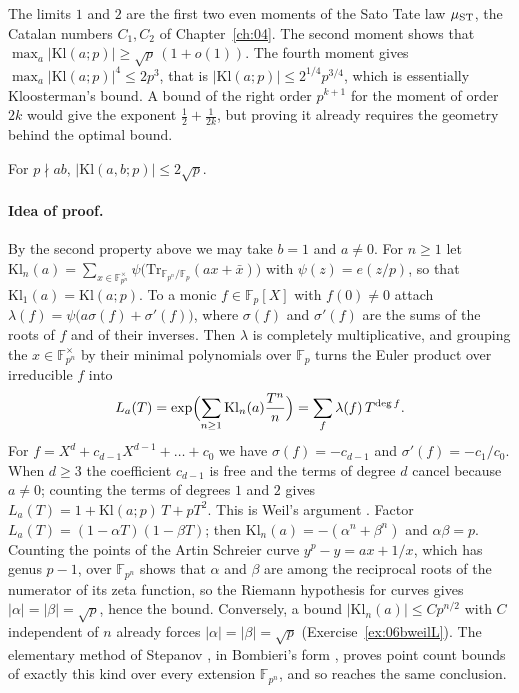 The limits $1$ and $2$ are the first two even moments of the Sato Tate law $\mu_{\mathrm{ST}}$, the Catalan numbers $C_1,C_2$ of Chapter~\ref{ch:04}. The second moment shows that $\max_a|\mathrm{Kl}(a;p)|\ge\sqrt{p}\,(1+o(1))$. The fourth moment gives $\max_a|\mathrm{Kl}(a;p)|^4\le2p^3$, that is $|\mathrm{Kl}(a;p)|\le2^{1/4}p^{3/4}$, which is essentially Kloosterman's bound. A bound of the right order $p^{k+1}$ for the moment of order $2k$ would give the exponent $\frac12+\frac1{2k}$, but proving it already requires the geometry behind the optimal bound.

\begin{theorem}\label{thm:06bweil}
For $p\nmid ab$, $|\mathrm{Kl}(a,b;p)|\le 2\sqrt p$.
\end{theorem}

\paragraph{Idea of proof.} By the second property above we may take $b=1$ and $a\ne0$. For $n\ge1$ let $\mathrm{Kl}_n(a)=\sum_{x\in\mathbb{F}_{p^n}^\times}\psi\bigl(\mathrm{Tr}_{\mathbb{F}_{p^n}/\mathbb{F}_p}(ax+\bar x)\bigr)$ with $\psi(z)=e(z/p)$, so that $\mathrm{Kl}_1(a)=\mathrm{Kl}(a;p)$. To a monic $f\in\mathbb{F}_p[X]$ with $f(0)\ne0$ attach $\lambda(f)=\psi\bigl(a\sigma(f)+\sigma'(f)\bigr)$, where $\sigma(f)$ and $\sigma'(f)$ are the sums of the roots of $f$ and of their inverses. Then $\lambda$ is completely multiplicative, and grouping the $x\in\mathbb{F}_{p^n}^\times$ by their minimal polynomials over $\mathbb{F}_p$ turns the Euler product over irreducible $f$ into
\[
L_a(T)=\exp\Bigl(\sum_{n\ge1}\mathrm{Kl}_n(a)\frac{T^n}{n}\Bigr)=\sum_{f}\lambda(f)\,T^{\deg f}.
\]
For $f=X^d+c_{d-1}X^{d-1}+\dots+c_0$ we have $\sigma(f)=-c_{d-1}$ and $\sigma'(f)=-c_1/c_0$. When $d\ge3$ the coefficient $c_{d-1}$ is free and the terms of degree $d$ cancel because $a\ne0$; counting the terms of degrees $1$ and $2$ gives $L_a(T)=1+\mathrm{Kl}(a;p)\,T+pT^2$. This is Weil's argument \cite{weil1948b}. Factor $L_a(T)=(1-\alpha T)(1-\beta T)$; then $\mathrm{Kl}_n(a)=-(\alpha^n+\beta^n)$ and $\alpha\beta=p$. Counting the points of the Artin Schreier curve $y^p-y=ax+1/x$, which has genus $p-1$, over $\mathbb{F}_{p^n}$ shows that $\alpha$ and $\beta$ are among the reciprocal roots of the numerator of its zeta function, so the Riemann hypothesis for curves gives $|\alpha|=|\beta|=\sqrt p$, hence the bound. Conversely, a bound $|\mathrm{Kl}_n(a)|\le Cp^{n/2}$ with $C$ independent of $n$ already forces $|\alpha|=|\beta|=\sqrt p$ (Exercise~\ref{ex:06bweilL}). The elementary method of Stepanov \cite{stepanov1969}, in Bombieri's form \cite{bombieri1974}, proves point count bounds of exactly this kind over every extension $\mathbb{F}_{p^n}$, and so reaches the same conclusion.

